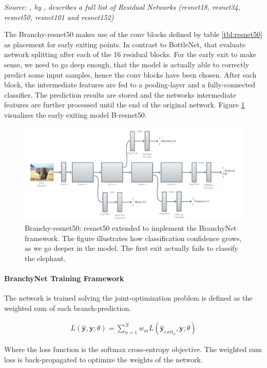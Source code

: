 	\vspace{-20pt} \textit{Source: , by \citeauthor{he_deep_2015} \cite{he_deep_2015}, describes a full list of Residual Networks (\gls{resnet}18, \gls{resnet}34, \gls{resnet}50, \gls{resnet}101 and \gls{resnet}152)}


The Branchy-\gls{resnet}50 makes use of the conv blocks defined by table \ref{tbl:resnet50} as placement for early exiting points. In contrast to BottleNet, that evaluate network splitting after each of the 16 residual blocks. For the early exit to make sense, we need to go deep enough, that the model is actually able to correctly predict some input samples, hence the conv blocks have been chosen. After each block, the intermediate features are fed to a pooling-layer and a fully-connected classifier. The prediction results are stored and the networks intermediate features are further processed until the end of the original network. Figure \ref{fig:b-resnet} visualizes the early exiting model B-\gls{resnet}50.

\begin{figure}
	\centering
	\includegraphics[width=\linewidth]{figures/models/BResNet}
	\caption[B-\gls{resnet} architecture]{Branchy-\gls{resnet}50: \gls{resnet}50 extended to implement the BranchyNet framework. The figure illustrates how classification confidence grows, as we go deeper in the model. The first exit actually fails to classify the elephant. }
	\label{fig:b-resnet}
\end{figure}



\paragraph{BranchyNet Training Framework}

The network is trained solving the joint-optimization problem is defined as the weighted sum of each branch-prediction.

\begin{align*}
	L(\hat{\mathbf{y}},\mathbf{y};\theta) = \sum_{n=1}^{N} w_m L(\hat{\mathbf{y}}_{exit_n},\mathbf{y};\theta)
\end{align*}

Where the loss function is the softmax cross-entropy objective.
The weighted sum loss is back-propagated to optimize the weights of the network. 